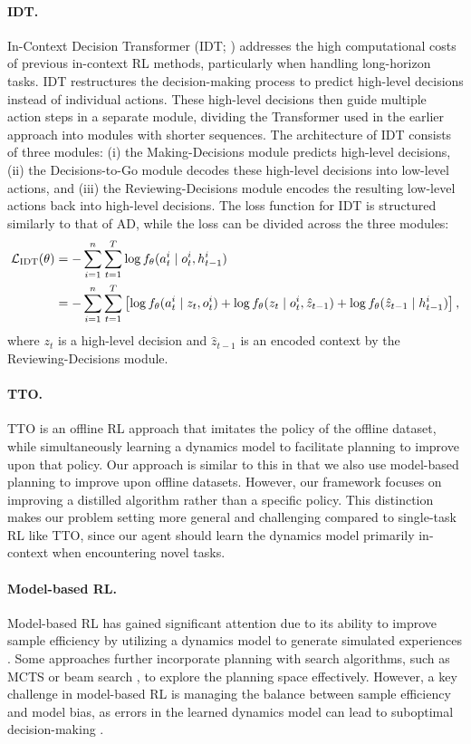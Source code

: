 \documentclass{article}
\begin{document}
\paragraph*{IDT.}
In-Context Decision Transformer (IDT; \citet{IDT}) addresses the high computational costs of previous in-context RL methods, particularly when handling long-horizon tasks.
IDT restructures the decision-making process to predict high-level decisions instead of individual actions.
These high-level decisions then guide multiple action steps in a separate module, dividing the Transformer used in the earlier approach \citep{AD} into modules with shorter sequences.
The architecture of IDT consists of three modules:
(i) the Making-Decisions module predicts high-level decisions,
(ii) the Decisions-to-Go module decodes these high-level decisions into low-level actions, and
(iii) the Reviewing-Decisions module encodes the resulting low-level actions back into high-level decisions.
The loss function for IDT is structured similarly to that of AD, while the loss can be divided across the three modules: 
\begin{align}
    {\mathcal{L}}_{\textrm{IDT}}(\theta) &= - \sum_{i=1}^n \sum_{t=1}^{T} \log f_\theta (a_t^i \mid o_t^i, h_{t-1}^i) \nonumber \\
    &= - \sum_{i=1}^n \sum_{t=1}^{T} \left[
    \log f_\theta(a_t^i \mid z_t, o_t^i) +
    \log f_\theta(z_t \mid o_t^i, \hat{z}_{t-1}) + 
    \log f_\theta(\hat{z}_{t-1} \mid h_{t-1}^i) \right], 
    \label{eq:idt}
\end{align}
where $z_t$ is a high-level decision and $\hat{z}_{t-1}$ is an encoded context by the Reviewing-Decisions module.

\paragraph*{TTO.}
TTO \citep{TTO} is an offline RL approach that imitates the policy of the offline dataset, while simultaneously learning a dynamics model to facilitate planning to improve upon that policy.
Our approach is similar to this in that we also use model-based planning to improve upon offline datasets.
However, our framework focuses on improving a distilled algorithm rather than a specific policy.
This distinction makes our problem setting more general and challenging compared to single-task RL like TTO, since our agent should learn the dynamics model primarily in-context when encountering novel tasks.

\paragraph*{Model-based RL.}
Model-based RL has gained significant attention due to its ability to improve sample efficiency by utilizing a dynamics model to generate simulated experiences \citep{WM, SimPLe, MBPO, MuZero, EfficientZero, DreamerV3}.
Some approaches further incorporate planning with search algorithms, such as MCTS \citep{MuZero,Reanalyse,EfficientZero} or beam search \citep{TTO}, to explore the planning space effectively.
However, a key challenge in model-based RL is managing the balance between sample efficiency and model bias, as errors in the learned dynamics model can lead to suboptimal decision-making \citep{MBPO}.
\end{document}
